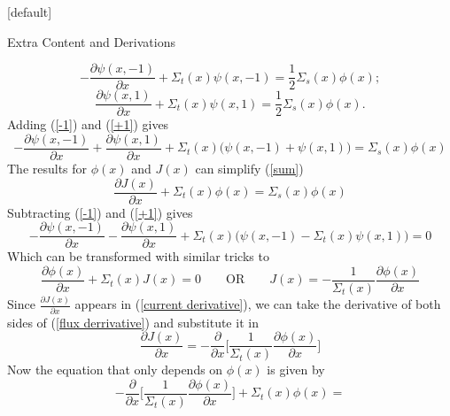 \documentclass[9pt,t]{beamer}
\makeatletter
\newcommand{\QOR}{\qquad \text{OR} \qquad}
\newenvironment{withoutheadline}{
       \setbeamertemplate{headline}[default]
       \def\beamer@entrycode{\vspace*{-\headheight}}
    }{}
\makeatother
\begin{document}
\begin{withoutheadline}
\begin{frame}[allowframebreaks]{Extra Content and Derivations}
\begin{itemize}
\begin{equation}
            -\frac{\partial \psi(x,-1)}{\partial x} + \Sigma_{t}(x)\psi(x,-1) =
            \frac{1}{2}\Sigma_{s}(x) \phi(x);
        \end{equation}
        \begin{equation} \label{+1}
            \frac{\partial \psi(x,1)}{\partial x} + \Sigma_{t}(x)\psi(x,1) =
            \frac{1}{2}\Sigma_{s}(x) \phi(x).
        \end{equation}
        Adding (\ref{-1}) and (\ref{+1}) gives
        \begin{equation}\label{sum}
            -\frac{\partial \psi(x,-1)}{\partial x} +  \frac{\partial \psi(x,1)}{\partial x} + \Sigma_{t}(x)\big(\psi(x,-1) + \psi(x,1) \big) =
            \Sigma_{s}(x) \phi(x)
        \end{equation}
        The results for $\phi(x)$ and $J(x)$ can simplify (\ref{sum})
        \begin{equation}  \label{current derivative}
            \frac{\partial J(x)}{\partial x} + \Sigma_{t}(x)\phi(x) =
            \Sigma_{s}(x) \phi(x)
        \end{equation}
        Subtracting  (\ref{-1}) and (\ref{+1}) gives
        \begin{equation}
            -\frac{\partial \psi(x,-1)}{\partial x}
            - \frac{\partial \psi(x,1)}{\partial x} + \Sigma_{t}(x)\big(\psi(x,-1)  - \Sigma_{t}(x)\psi(x,1)\big) =
            0
        \end{equation}
        Which can be transformed with similar tricks to
        \begin{equation} \label{flux derrivative}
            \frac{\partial\phi(x)}{\partial x} + \Sigma_{t}(x)J(x) = 0 \QOR
            J(x) = - \frac{1}{\Sigma_{t}(x)} \frac{\partial\phi(x)}{\partial x}
        \end{equation}
        Since $\frac{\partial J(x)}{\partial x}$ appears in (\ref{current derivative}), we can take the derivative of both sides of (\ref{flux derrivative}) and substitute it in
        \begin{equation}
          \frac{\partial J(x)}{\partial x} =
          - \frac{\partial}{\partial x} \bigg[ \frac{1}{\Sigma_{t}(x)} \frac{\partial\phi(x)}{\partial x} \bigg]
        \end{equation}
        Now the equation that only depends on $\phi(x)$ is given by
        \begin{equation}
            -\frac{\partial}{\partial x}\bigg[\frac{1}{\Sigma_{t}(x)} \frac{\partial\phi(x)}{\partial x} \bigg] + \Sigma_{t}(x)\phi(x) =

\end{equation}
\end{itemize}
\end{frame}
\end{withoutheadline}
\end{document}
